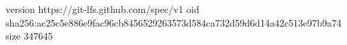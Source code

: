 version https://git-lfs.github.com/spec/v1
oid sha256:ac25c5e886e9fac96cb8456529263573d584ca732d59d6d14a42c513e97b9a74
size 347645
